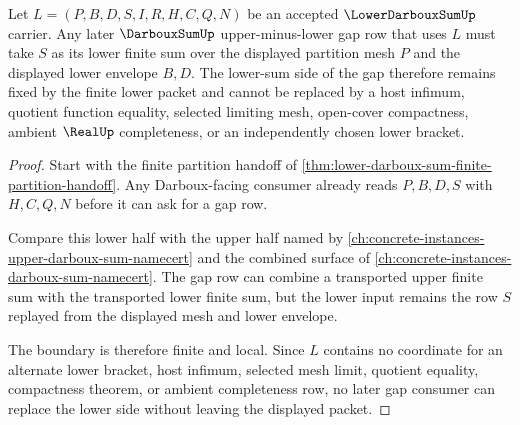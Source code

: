 \begin{theorem}\label{thm:lower-darboux-sum-darboux-gap-boundary}
Let $L=(P,B,D,S,I,R,H,C,Q,N)$ be an accepted $\LowerDarbouxSumUp$ carrier. Any later $\DarbouxSumUp$ upper-minus-lower gap row that uses $L$ must take $S$ as its lower finite sum over the displayed partition mesh $P$ and the displayed lower envelope $B,D$. The lower-sum side of the gap therefore remains fixed by the finite lower packet and cannot be replaced by a host infimum, quotient function equality, selected limiting mesh, open-cover compactness, ambient $\RealUp$ completeness, or an independently chosen lower bracket.
\end{theorem}
\begin{proof}
Start with the finite partition handoff of \autoref{thm:lower-darboux-sum-finite-partition-handoff}. Any Darboux-facing consumer already reads $P,B,D,S$ with $H,C,Q,N$ before it can ask for a gap row.

Compare this lower half with the upper half named by \autoref{ch:concrete-instances-upper-darboux-sum-namecert} and the combined surface of \autoref{ch:concrete-instances-darboux-sum-namecert}. The gap row can combine a transported upper finite sum with the transported lower finite sum, but the lower input remains the row $S$ replayed from the displayed mesh and lower envelope.

The boundary is therefore finite and local. Since $L$ contains no coordinate for an alternate lower bracket, host infimum, selected mesh limit, quotient equality, compactness theorem, or ambient completeness row, no later gap consumer can replace the lower side without leaving the displayed packet.
\end{proof}



